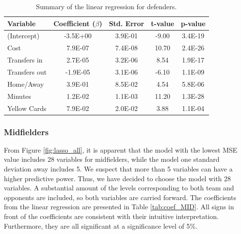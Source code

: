 \begin{table}[H]
\centering
\begin{tabular}{|l|c|c|c|c|}
\hline
Variable      & Coefficient ($\beta$) & Std. Error & t-value & p-value \\ \hline
(Intercept)   & -3.5E+00     & 3.9E-01    & -9.00    & 3.4E-19 \\
Cost          & 7.9E-07      & 7.4E-08    & 10.70    & 2.4E-26 \\
Transfers in  & 2.7E-05      & 3.2E-06    & 8.54     & 1.9E-17 \\
Transfers out & -1.9E-05     & 3.1E-06    & -6.10    & 1.1E-09 \\
Home/Away     & 3.9E-01      & 8.5E-02    & 4.54     & 5.8E-06 \\
Minutes       & 1.2E-02      & 1.1E-03    & 11.20    & 1.3E-28 \\
Yellow Cards  & 7.9E-02      & 2.0E-02    & 3.88     & 1.1E-04 \\
\hline
\end{tabular}
\caption{Summary of the linear regression for defenders.}
\label{tab:coef_DEF}
\end{table}


\subsubsection{Midfielders}
From Figure \ref{fig:lasso_all}, it is apparent that the model with the lowest MSE value includes 28 variables for midfielders, while the model one standard deviation away includes 5. We suspect that more than 5 variables can have a higher predictive power. Thus, we have decided to choose the model with 28 variables. A substantial amount of the levels corresponding to both team and opponents are included, so both variables are carried forward. The coefficients from the linear regression are presented in Table \ref{tab:coef_MID}. All signs in front of the coefficients are consistent with their intuitive interpretation. Furthermore, they are all significant at a significance level of 5\%.

